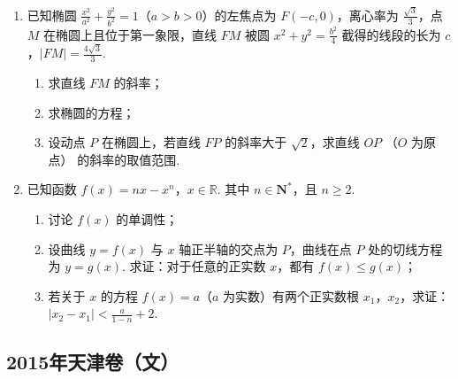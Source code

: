 \begin{description}
\begin{enumerate}[leftmargin=5pt]
\begin{enumerate}
\item 求 q 的值和 \( \{a_{n}\} \) 的通项公式；
\item 设 \(b_{n}=\frac{\log_{2}a_{2n}}{a_{2n-1}}\)，\(n\in \mathbf{N}^{*}\)，求数列 \( \{b_{n}\} \) 的前 \(n\) 项和.
\end{enumerate}

        \item 已知椭圆 \(\frac{x^2}{a^2} + \frac{y^2}{b^2} = 1\)（\(a > b > 0\)）的左焦点为 \(F(-c, 0)\)，离心率为 \(\frac{\sqrt{3}}{3}\)，点 \(M\) 在椭圆上且位于第一象限，直线 \(FM\) 被圆 \(x^2 + y^2 = \frac{b^2}{4}\) 截得的线段的长为 \(c\)，\(|FM| = \frac{4\sqrt{3}}{3}\).

\begin{enumerate}
\item 求直线 \(FM\) 的斜率；
\item 求椭圆的方程；
\item 设动点 \(P\) 在椭圆上，若直线 \(FP\) 的斜率大于 \(\sqrt{2}\)，求直线 \(OP\) （\(O\) 为原点） 的斜率的取值范围.
\end{enumerate}

        \item 已知函数 \(f(x) = nx - x^n\)，\(x \in \mathbb{R}\). 其中 \( n \in \mathbf{N}^* \)，且 \( n \geqslant 2 \).

\begin{enumerate}
\item 讨论 \( f(x) \) 的单调性；
\item 设曲线 \( y = f(x) \) 与 \( x \) 轴正半轴的交点为 \(P\)，曲线在点 \(P\) 处的切线方程为 \( y = g(x) \). 求证：对于任意的正实数 \( x \)，都有 \( f(x) \leqslant g(x) \)；
\item 若关于 \(x\) 的方程 \(f(x)=a\)（\(a\) 为实数）有两个正实数根 \(x_{1}\)，\(x_{2}\)，求证： \(|x_{2} - x_{1}| < \frac{a}{1 - n} + 2\).
\end{enumerate}

    \end{enumerate}

\end{description}


\subsection{2015年天津卷（文）}\label{gk:2015年天津卷（文）}

